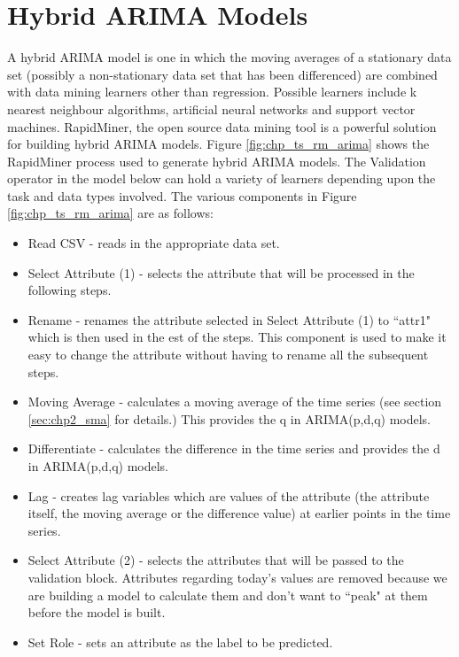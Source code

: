 
\section{Hybrid ARIMA Models}
A hybrid ARIMA model is one in which the moving averages of a stationary data set (possibly a non-stationary data set that has been differenced) are combined with data mining learners other than regression. Possible learners include k nearest neighbour algorithms, artificial neural networks and support vector machines.  RapidMiner, the open source data mining tool is a powerful solution for building hybrid ARIMA models. Figure \ref{fig:chp_ts_rm_arima} shows the RapidMiner process used to generate hybrid ARIMA models. The Validation operator in the model below can hold a variety of learners depending upon the task and data types involved. The various components in Figure \ref{fig:chp_ts_rm_arima} are as follows:

\begin{itemize}
\item Read CSV - reads in the appropriate data set.
\item Select Attribute (1) - selects the attribute that will be processed in the following steps.
\item Rename - renames the attribute selected in Select Attribute (1) to \textquotedblleft attr1" which is then used in the est of the steps. This component is used to make it easy to change the attribute without having to rename all the subsequent steps.
\item Moving Average - calculates a moving average of the time series (see section \ref{sec:chp2_sma} for details.) This provides the q in ARIMA(p,d,q) models.
\item Differentiate - calculates the difference in the time series and provides the d in ARIMA(p,d,q) models.
\item Lag - creates lag variables which are values of the attribute (the attribute itself, the moving average or the difference value) at earlier points in the time series.
\item Select Attribute (2) - selects the attributes that will be passed to the validation block. Attributes regarding today's values are removed because we are building a model to calculate them and don't want to \textquotedblleft peak" at them before the model is built.
\item Set Role - sets an attribute as the label to be predicted.

\end{itemize}

